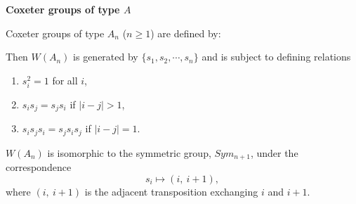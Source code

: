 \documentclass{beamer}
\begin{document}
\begin{frame}{\textbf{Coxeter groups of type $A$}}

Coxeter groups of type $A_{n}$ ($n\geq 1$) are defined by:
\begin{figure}
\end{figure}

\pause
 
Then $W(A_{n})$ is generated by $\{s_{1}, s_{2}, \cdots, 
s_{n}\}$ and is subject to defining relations
\begin{enumerate}
\item $s_{i}^{2}=1$ for all $i$,
\item $s_{i}s_{j}=s_{j}s_{i}$ if $|i-j|>1$,
\item $s_{i}s_{j}s_{i}=s_{j}s_{i}s_{j}$ if $|i-j|=1$.
\end{enumerate}
\pause 
$W(A_{n})$ is isomorphic to the symmetric group, $Sym_{n+1}$, under 
the correspondence 
\[
s_{i}\mapsto (i,\ i+1),
\]
where $(i,\ i+1)$ is the adjacent transposition exchanging $i$ and $i+1$.

\end{frame}

\end{document}

